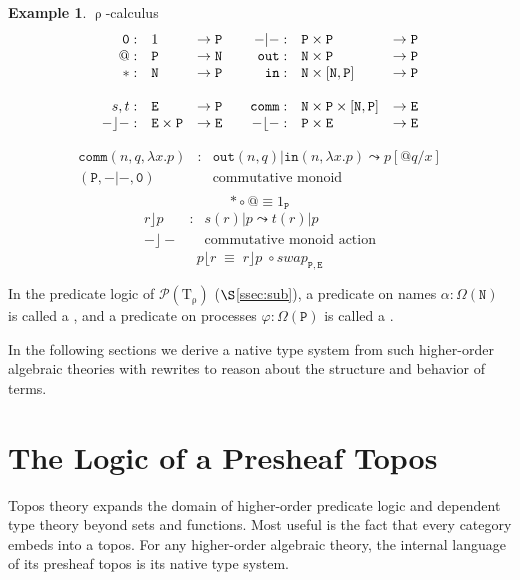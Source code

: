 \documentclass[12pt]{article}
\theoremstyle{definition}
\newtheorem{example}[theorem]{Example}
\newcommand{\define}[1]{{\bf \boldmath{#1}}}
\newcommand{\msc}[1]{\mathscr{#1}}
\newcommand{\mrm}[1]{\mathrm{#1}}
\newcommand{\mtt}[1]{\mathtt{#1}}
\newcommand{\T}{\mrm{T}}
\newcommand{\pow}{\msc{P}}
\newcommand{\N}{\mtt{N}}
\newcommand{\PP}{\mtt{P}}
\newcommand{\tto}{\mtt{out}}
\newcommand{\tti}{\mtt{in}}
\newcommand{\ttz}{\mtt{0}}
\begin{document}
\begin{example}
$\uprho$-calculus
\[\begin{array}{rll@{\quad\quad}rll}
    \ttz: &1 &\to \PP & -\vert-: & \PP\times\PP & \to \PP \\
    @: & \PP & \to \N &  \mtt{out}: & \N\times\PP & \to \PP\\
    \ast: & \N & \to \PP & \mtt{in}: & \N\times[\N,\PP] & \to \PP\\~\\
    s,t: &\mtt{E} & \to \PP & \mtt{comm}: &\N\times\PP\times [\N,\PP] & \to \mtt{E}\\
    -\rfloor-: & \mtt{E}\times\PP & \to \mtt{E} & -\lfloor-: & \PP \times \mtt{E} & \to \mtt{E}\\
\end{array}\]

\[\begin{array}{rcl}
    \mtt{comm}(n,q,\lambda x.p) & : & \tto(n,q)|\tti(n,\lambda x.p) \leadsto p[@q/x]\\
    (\PP,-|-,\ttz) && \text{commutative monoid}\\
    \end{array}\]
\[\ast\circ @ \equiv 1_\PP\]
\[\begin{array}{rcl}
    r \rfloor p & : & s(r) | p \leadsto t(r) | p \\
    -\rfloor - && \text{commutative monoid action}
\end{array}\]
\[p \lfloor r \;\equiv \; r\rfloor p \; \circ swap_{\PP,\mtt{E}}\]
\end{example}

In the predicate logic of $\pow(\T_\uprho)$ ($\S$\ref{ssec:sub}), a predicate on names $\alpha:\Omega(\N)$ is called a \define{namespace} \cite{namespace}, and a predicate on processes $\varphi:\Omega(\PP)$ is called a \define{codespace}.

In the following sections we derive a native type system from such higher-order algebraic theories with rewrites to reason about the structure and behavior of terms.




\section{The Logic of a Presheaf Topos}
\label{sec:topos}

Topos theory \cite{sheavesinGL} expands the domain of higher-order predicate logic and dependent type theory beyond sets and functions. Most useful is the fact that every category embeds into a topos. For any higher-order algebraic theory, the internal language of its presheaf topos is its native type system.
\end{document}

